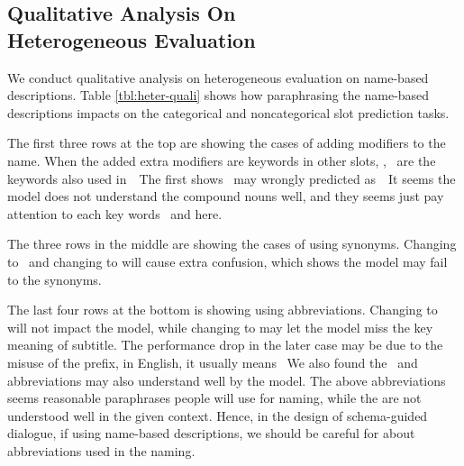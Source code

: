 \subsection[Qualitative Analysis On Heterogeneous
Evaluation]{Qualitative Analysis On \\Heterogeneous Evaluation}
\label{ssec:qualitative-analysis}
We conduct qualitative analysis on heterogeneous evaluation on
name-based descriptions. Table \ref{tbl:heter-quali} shows how
paraphrasing the name-based descriptions impacts on the categorical and
noncategorical slot prediction tasks.

The first three rows at the top are showing the cases of adding modifiers
to the name. When the added extra modifiers are keywords in other
slots, \eg,~ are the keywords also used
in~~The first
shows~ may wrongly predicted
as~~It seems the model does not understand
the compound nouns well, and they seems just pay attention to each key
words~ and  here.

The three rows in the middle are showing the cases of using
synonyms. Changing  to ~and changing  to  will
cause extra confusion, which shows the model may fail to the synonyms.

The last four rows at the bottom is showing using abbreviations. Changing
 to  will not impact the model, while
changing  to  may let the model miss
the key meaning of subtitle.  The performance drop in the later case
may be due to the misuse of the  prefix, in English, it
usually means ~We also
found the~ and~ abbreviations may also understand well by
the model. The above abbreviations seems reasonable paraphrases people
will use for naming, while the are not understood well in the given
context. Hence, in the design of schema-guided dialogue, if using
name-based descriptions, we should be careful for about abbreviations
used in the naming.

